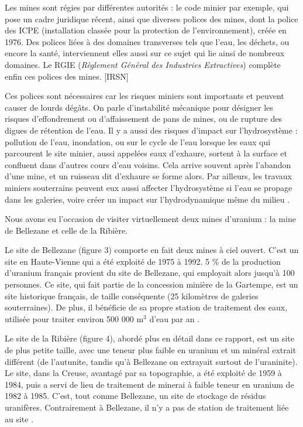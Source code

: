 \documentclass{article}
\begin{document}
Les mines sont régies par différentes autorités : le code minier par exemple, qui pose un cadre juridique récent, ainsi que diverses polices des mines, dont la police des ICPE (installation classée pour la protection de l’environnement), créée en 1976. Des polices liées à des domaines transverses tels que l’eau, les déchets, ou encore la santé, interviennent elles aussi sur ce sujet qui lie ainsi de nombreux domaines. Le RGIE (\emph{Règlement Général des Industries Extractives}) complète enfin ces polices des mines. [IRSN]

Ces polices sont nécessaires car les risques miniers sont importants et peuvent causer de lourds dégâts. On parle d’instabilité mécanique pour désigner les risques d’effondrement ou d’affaissement de pans de mines, ou de rupture des digues de rétention de l’eau. Il y a aussi des risques d’impact sur l’hydrosystème : pollution de l’eau, inondation, ou sur le cycle de l’eau lorsque les eaux qui parcourent le site minier, aussi appelées eaux d’exhaure, sortent à la surface et confluent dans d’autres cours d’eau voisins. Cela arrive souvent après l’abandon d’une mine, et un ruisseau dit d’exhaure se forme alors. Par ailleurs, les travaux miniers souterrains peuvent eux aussi affecter l’hydrosystème si l’eau se propage dans les galeries, voire créer un impact sur l’hydrodynamique même du milieu \cite{ledoux_notions_2020}\cite{raimbault_mine_2020}.

Nous avons eu l’occasion de visiter virtuellement deux mines d’uranium : la mine de Bellezane et celle de la Ribière. 

Le site de Bellezane (figure 3) comporte en fait deux mines à ciel ouvert. C’est un site en Haute-Vienne qui a été exploité de 1975 à 1992. 5 \% de la production d’uranium français provient du site de Bellezane, qui employait alors jusqu’à 100 personnes. Ce site, qui fait partie de la concession minière de la Gartempe, est un site historique français, de taille conséquente (25 kilomètres de galeries souterraines). De plus, il bénéficie de sa propre station de traitement des eaux, utilisée pour traiter environ 500 000 $\text{m}^3$ d’eau par an \cite{benesteau_site_2020}.

Le site de la Ribière (figure 4), abordé plus en détail dans ce rapport, est un site de plus petite taille, avec une teneur plus faible en uranium et un minéral extrait différent (de l’autunite, tandis qu’à Bellezane on extrayait surtout de l’uraninite). Le site, dans la Creuse, avantagé par sa topographie, a été exploité de 1959 à 1984, puis a servi de lieu de traitement de minerai à faible teneur en uranium de 1982 à 1985. C’est, tout comme Bellezane, un site de stockage de résidus uranifères. Contrairement à Bellezane, il n’y a pas de station de traitement liée au site \cite{descostes_introduction_2020}.
\end{document}
